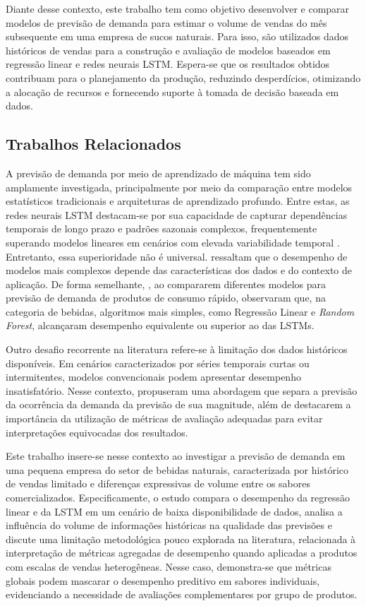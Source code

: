 Diante desse contexto, este trabalho tem como objetivo desenvolver e comparar modelos de previsão de demanda para estimar o volume de vendas do mês subsequente em uma empresa de sucos naturais. Para isso, são utilizados dados históricos de vendas para a construção e avaliação de modelos baseados em regressão linear e redes neurais LSTM. Espera-se que os resultados obtidos contribuam para o planejamento da produção, reduzindo desperdícios, otimizando a alocação de recursos e fornecendo suporte à tomada de decisão baseada em dados.

\subsection{Trabalhos Relacionados}

A previsão de demanda por meio de aprendizado de máquina tem sido amplamente investigada, principalmente por meio da comparação entre modelos estatísticos tradicionais e arquiteturas de aprendizado profundo. Entre estas, as redes neurais LSTM destacam-se por sua capacidade de capturar dependências temporais de longo prazo e padrões sazonais complexos, frequentemente superando modelos lineares em cenários com elevada variabilidade temporal \cite{douaioui2024machine, veres2024application}. Entretanto, essa superioridade não é universal. \cite{veres2024application} ressaltam que o desempenho de modelos mais complexos depende das características dos dados e do contexto de aplicação. De forma semelhante, \cite{golabek2020demand}, ao compararem diferentes modelos para previsão de demanda de produtos de consumo rápido, observaram que, na categoria de bebidas, algoritmos mais simples, como Regressão Linear e \textit{Random Forest}, alcançaram desempenho equivalente ou superior ao das LSTMs.

Outro desafio recorrente na literatura refere-se à limitação dos dados históricos disponíveis. Em cenários caracterizados por séries temporais curtas ou intermitentes, modelos convencionais podem apresentar desempenho insatisfatório. Nesse contexto, \cite{rovzanec2103reframing} propuseram uma abordagem que separa a previsão da ocorrência da demanda da previsão de sua magnitude, além de destacarem a importância da utilização de métricas de avaliação adequadas para evitar interpretações equivocadas dos resultados.

Este trabalho insere-se nesse contexto ao investigar a previsão de demanda em uma pequena empresa do setor de bebidas naturais, caracterizada por histórico de vendas limitado e diferenças expressivas de volume entre os sabores comercializados. Especificamente, o estudo compara o desempenho da regressão linear e da LSTM em um cenário de baixa disponibilidade de dados, analisa a influência do volume de informações históricas na qualidade das previsões e discute uma limitação metodológica pouco explorada na literatura, relacionada à interpretação de métricas agregadas de desempenho quando aplicadas a produtos com escalas de vendas heterogêneas. Nesse caso, demonstra-se que métricas globais podem mascarar o desempenho preditivo em sabores individuais, evidenciando a necessidade de avaliações complementares por grupo de produtos.